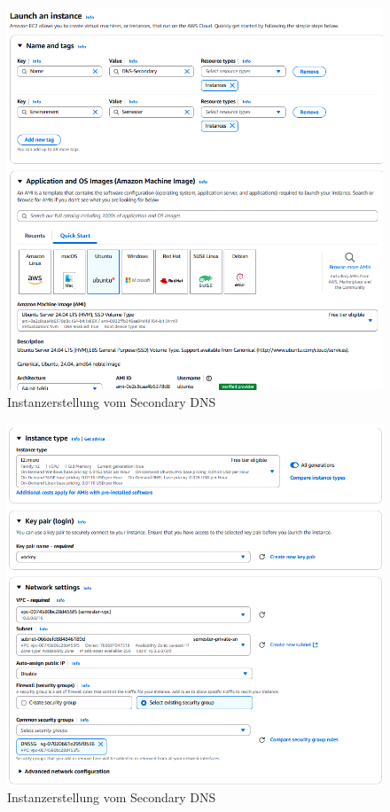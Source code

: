 \documentclass[a4paper,12pt]{article}
\begin{document}
\begin{figure}[H]
	\centering
	\includegraphics[width=\textwidth]{data/Launch_Instance_DNS_Secondary.png}
	\caption{Instanzerstellung vom Secondary DNS}
	\label{fig:Instanzecreation vom Secondary DNS}
\end{figure}

\begin{figure}[H]
	\centering
	\includegraphics[width=\textwidth]{data/Launch_Instance_DNS_Secondary2.png}
	\caption{Instanzerstellung vom Secondary DNS}
	\label{fig:Instanzecreation vom Secondary DNS2}
\end{figure}
\end{document}
